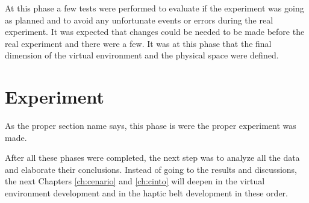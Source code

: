         At this phase a few tests were performed to evaluate if the experiment was going as planned and to avoid any unfortunate events or errors during the real experiment. It was expected that changes could be needed to be made before the real experiment and there were a few. It was at this phase that the final dimension of the virtual environment and the physical space were defined.

\section{Experiment}
\label{sec:experiment}
        
        As the proper section name says, this phase is were the proper experiment was made.

After all these phases were completed, the next step was to analyze all the data and elaborate their conclusions. Instead of going to the results and discussions, the next Chapters \ref{ch:cenario} and \ref{ch:cinto} will deepen in the virtual environment development and in the haptic belt development in these order.